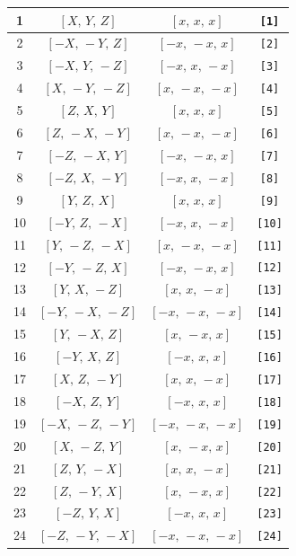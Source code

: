 \documentclass[fleqn,8pt]{jsarticle}
\begin{document}
\begin{longtable}{cccc}
1 & $\left[ X,\, Y,\, Z \right]$ & $\left[ x,\, x,\, x \right]$ & {\tt [1]} \\ \hline
2 & $\left[ - X,\, - Y,\, Z \right]$ & $\left[ - x,\, - x,\, x \right]$ & {\tt [2]} \\ \hline
3 & $\left[ - X,\, Y,\, - Z \right]$ & $\left[ - x,\, x,\, - x \right]$ & {\tt [3]} \\ \hline
4 & $\left[ X,\, - Y,\, - Z \right]$ & $\left[ x,\, - x,\, - x \right]$ & {\tt [4]} \\ \hline
5 & $\left[ Z,\, X,\, Y \right]$ & $\left[ x,\, x,\, x \right]$ & {\tt [5]} \\ \hline
6 & $\left[ Z,\, - X,\, - Y \right]$ & $\left[ x,\, - x,\, - x \right]$ & {\tt [6]} \\ \hline
7 & $\left[ - Z,\, - X,\, Y \right]$ & $\left[ - x,\, - x,\, x \right]$ & {\tt [7]} \\ \hline
8 & $\left[ - Z,\, X,\, - Y \right]$ & $\left[ - x,\, x,\, - x \right]$ & {\tt [8]} \\ \hline
9 & $\left[ Y,\, Z,\, X \right]$ & $\left[ x,\, x,\, x \right]$ & {\tt [9]} \\ \hline
10 & $\left[ - Y,\, Z,\, - X \right]$ & $\left[ - x,\, x,\, - x \right]$ & {\tt [10]} \\ \hline
11 & $\left[ Y,\, - Z,\, - X \right]$ & $\left[ x,\, - x,\, - x \right]$ & {\tt [11]} \\ \hline
12 & $\left[ - Y,\, - Z,\, X \right]$ & $\left[ - x,\, - x,\, x \right]$ & {\tt [12]} \\ \hline
13 & $\left[ Y,\, X,\, - Z \right]$ & $\left[ x,\, x,\, - x \right]$ & {\tt [13]} \\ \hline
14 & $\left[ - Y,\, - X,\, - Z \right]$ & $\left[ - x,\, - x,\, - x \right]$ & {\tt [14]} \\ \hline
15 & $\left[ Y,\, - X,\, Z \right]$ & $\left[ x,\, - x,\, x \right]$ & {\tt [15]} \\ \hline
16 & $\left[ - Y,\, X,\, Z \right]$ & $\left[ - x,\, x,\, x \right]$ & {\tt [16]} \\ \hline
17 & $\left[ X,\, Z,\, - Y \right]$ & $\left[ x,\, x,\, - x \right]$ & {\tt [17]} \\ \hline
18 & $\left[ - X,\, Z,\, Y \right]$ & $\left[ - x,\, x,\, x \right]$ & {\tt [18]} \\ \hline
19 & $\left[ - X,\, - Z,\, - Y \right]$ & $\left[ - x,\, - x,\, - x \right]$ & {\tt [19]} \\ \hline
20 & $\left[ X,\, - Z,\, Y \right]$ & $\left[ x,\, - x,\, x \right]$ & {\tt [20]} \\ \hline
21 & $\left[ Z,\, Y,\, - X \right]$ & $\left[ x,\, x,\, - x \right]$ & {\tt [21]} \\ \hline
22 & $\left[ Z,\, - Y,\, X \right]$ & $\left[ x,\, - x,\, x \right]$ & {\tt [22]} \\ \hline
23 & $\left[ - Z,\, Y,\, X \right]$ & $\left[ - x,\, x,\, x \right]$ & {\tt [23]} \\ \hline
24 & $\left[ - Z,\, - Y,\, - X \right]$ & $\left[ - x,\, - x,\, - x \right]$ & {\tt [24]} \\
\end{longtable}
\end{document}

